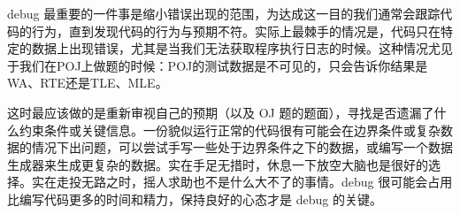 \documentclass[../main.tex]{subfiles}
\begin{document}
debug 最重要的一件事是缩小错误出现的范围，为达成这一目的我们通常会跟踪代码的行为，直到发现代码的行为与预期不符。实际上最棘手的情况是，代码只在特定的数据上出现错误，尤其是当我们无法获取程序执行日志的时候。这种情况尤见于我们在POJ上做题的时候：POJ的测试数据是不可见的，只会告诉你结果是WA、RTE还是TLE、MLE。

这时最应该做的是重新审视自己的预期（以及 OJ 题的题面），寻找是否遗漏了什么约束条件或关键信息。一份貌似运行正常的代码很有可能会在边界条件或复杂数据的情况下出问题，可以尝试手写一些处于边界条件之下的数据，或编写一个数据生成器来生成更复杂的数据。实在手足无措时，休息一下放空大脑也是很好的选择。实在走投无路之时，摇人求助也不是什么大不了的事情。debug 很可能会占用比编写代码更多的时间和精力，保持良好的心态才是 debug 的关键。
\end{document}
